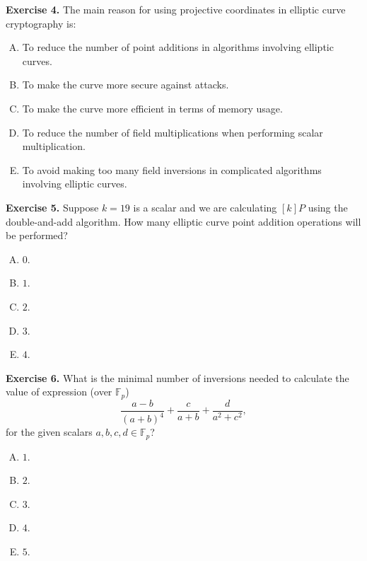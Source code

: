 \documentclass[../lecture-notes-148x210.tex]{subfiles}
\begin{document}
\textbf{Exercise 4.} The main reason for using projective coordinates in elliptic curve cryptography is:
\begin{enumerate}[(A)]
    \item To reduce the number of point additions in algorithms involving elliptic curves.
    \item To make the curve more secure against attacks.
    \item To make the curve more efficient in terms of memory usage.
    \item To reduce the number of field multiplications when performing scalar multiplication.
    \item To avoid making too many field inversions in complicated algorithms involving elliptic curves.
\end{enumerate}

\textbf{Exercise 5.} Suppose $k=19$ is a scalar and we are calculating $[k]P$ using the double-and-add algorithm. How many elliptic curve point addition operations will be performed?
\begin{multicols}{5}
    \begin{enumerate}[(A)]
        \item $0$.
        \item $1$.
        \item $2$.
        \item $3$.
        \item $4$.
    \end{enumerate}
\end{multicols}

\textbf{Exercise 6.} What is the minimal number of inversions needed to calculate the value of expression (over $\mathbb{F}_p$)
\begin{equation*}
    \frac{a-b}{(a+b)^4} + \frac{c}{a+b} + \frac{d}{a^2+c^2},
\end{equation*}
for the given scalars $a,b,c,d \in \mathbb{F}_p$?
\begin{multicols}{5}
    \begin{enumerate}[(A)]
        \item $1$.
        \item $2$.
        \item $3$.
        \item $4$.
        \item $5$.
    \end{enumerate}
\end{multicols}
\end{document}
